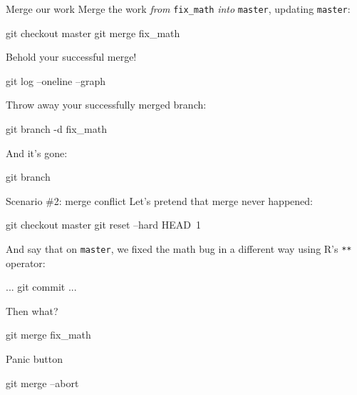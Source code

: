 \begin{frame}[fragile]{Merge our work}
  Merge the work \emph{from} \texttt{fix\_math} \emph{into} \texttt{master}, updating \texttt{master}:

  \begin{gitCommand}
git checkout master
git merge fix_math
  \end{gitCommand}

  Behold your successful merge!

  \begin{gitCommand}git log --oneline --graph\end{gitCommand}

  Throw away your successfully merged branch:

  \begin{gitCommand}git branch -d fix_math\end{gitCommand}

  And it's gone:

  \begin{gitCommand}git branch\end{gitCommand}

\end{frame}

\begin{frame}[fragile]{Scenario \#2: merge conflict}
  Let's pretend that merge never happened:

  \begin{gitCommand}
git checkout master
git reset --hard HEAD~1
  \end{gitCommand}

  And say that on \texttt{master}, we fixed the math bug in a
  different way using R's \texttt{**} operator:

  \begin{gitCommand}
...
git commit ...
  \end{gitCommand}

  Then what?

  \begin{gitCommand}git merge fix_math\end{gitCommand}
\end{frame}

\begin{frame}[fragile]{Panic button}
  \begin{gitCommand}git merge --abort\end{gitCommand}
\end{frame}

